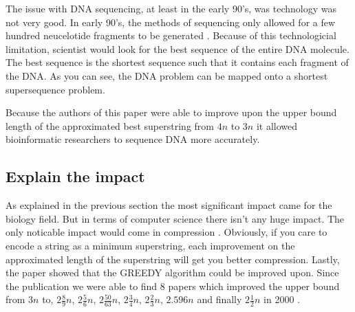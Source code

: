 \documentclass[letterpaper,twocolumn,11pt]{article}
\begin{document}
The issue with DNA sequencing, at least in the early 90's, was technology was not very good. In early 90's, the methods of sequencing only allowed for a few hundred neucelotide fragments to be generated \cite{karp1993mapping}. Because of this technologicial limitation, scientist would look for the best sequence of the entire DNA molecule. The best sequence is the shortest sequence such that it contains each fragment of the DNA. As you can see, the DNA problem can be mapped onto a shortest supersequence problem. 

Because the authors of this paper were able to improve upon the upper bound length of the approximated best superstring from $4n$ to $3n$ it allowed bioinformatic researchers to sequence DNA more accurately. 



\subsection*{Explain the impact}
As explained in the previous section the most significant impact came for the biology field. But in terms of computer science there isn't any huge impact. The only noticable impact would come in compression \cite{storer1988data}. Obviously, if you care to encode a string as a minimum superstring, each improvement on the approximated length of the superstring will get you better compression. Lastly, the paper showed that the GREEDY algorithm could be improved upon. Since the publication we were able to find 8 papers which improved the upper bound from $3n$ to, $2 \frac{8}{9}n$, $2 \frac{5}{6}n$, $2 \frac{50}{63}n$, $2 \frac{3}{4}n$, $2 \frac{2}{3}n$, $2.596n$ and finally $2 \frac{1}{2}n$ in 2000 \cite{sweedyk2000boldmath}.
\end{document}
